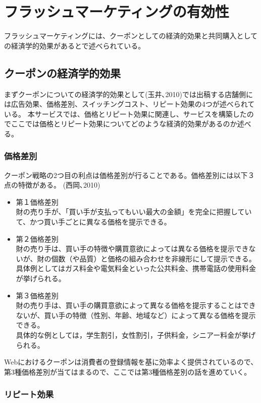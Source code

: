 \section{フラッシュマーケティングの有効性}
フラッシュマーケティングには、クーポンとしての経済的効果と共同購入としての経済学的効果があるとで述べられている。
\subsection{クーポンの経済学的効果}
まずクーポンについての経済学的効果として(玉井､2010)では出稿する店舗側には広告効果、価格差別、スイッチングコスト、リピート効果の4つが述べられている。
本サービスでは、価格とリピート効果に関連し、サービスを構築したのでここでは価格とリピート効果についてどのような経済的効果があるのか述べる。
\subsubsection{価格差別}
クーポン戦略の2つ目の利点は価格差別が行ることである。価格差別には以下３点の特徴がある。 (西岡､2010)
\begin{itemize}
	\item 第１価格差別
	\\財の売り手が、「買い手が支払ってもいい最大の金額」を完全に把握していて、かつ買い手ごとに異なる価格を提示できる。
	\item 第２価格差別
	\\財の売り手は、買い手の特徴や購買意欲によっては異なる価格を提示できないが、財の個数（や品質）と価格の組み合わせを非線形にして提示できる。
	\\具体例としてはガス料金や電気料金といった公共料金、携帯電話の使用料金が挙げられる。
	\item 第３価格差別
	\\財の売り手は、買い手の購買意欲によって異なる価格を提示することはできないが、買い手の特徴（性別、年齢、地域など）によって異なる価格を提示できる。
	\\具体的な例としては，学生割引，女性割引，子供料金，シニアー料金が挙げられる。	
\end{itemize}
Webにおけるクーポンは消費者の登録情報を基に効率よく提供されているので、第3種価格差別が当てはまるので、ここでは第3種価格差別の話を進めていく。
\subsubsection{リピート効果}
